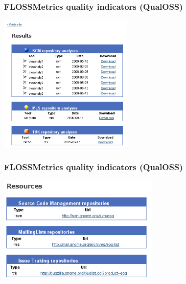 \documentclass{beamer}
\begin{document}
\begin{frame}
\frametitle{FLOSSMetrics quality indicators (QualOSS)}
\begin{center}
\includegraphics[width=0.5\textwidth]{figs/fm3-results.png}
\end{center}
\end{frame}

\begin{frame}
\frametitle{FLOSSMetrics quality indicators (QualOSS)}
\begin{center}
\includegraphics[width=0.6\textwidth]{figs/fm3-resources.png}
\end{center}
\end{frame}
\end{document}
